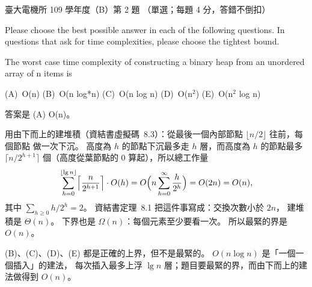 \begin{pastexam}[label={px:ntu-109-ee-ds-02}]{臺大電機所 109 學年度（B）第 2 題}
（單選；每題 4 分，答錯不倒扣）

Please choose the best possible answer in each of the following questions. In questions that ask
for time complexities, please choose the tightest bound.

The worst case time complexity of constructing a binary heap from an unordered array of n items is

(A)~O(n) \qquad (B)~O(n log*n) \qquad (C)~O(n log n) \qquad (D)~O(n$^2$) \qquad (E)~O(n$^2$ log n)
\end{pastexam}

\begin{pastsoln}
答案是 (A) O(n)。

用由下而上的建堆積（資結書虛擬碼~8.3）：從最後一個內部節點 $\lfloor n/2 \rfloor$ 往前，每個節點
做一次下沉。 高度為 $h$ 的節點下沉最多走 $h$ 層，而高度為 $h$ 的節點最多 $\lceil n/2^{h+1}
\rceil$ 個（高度從葉節點的 $0$ 算起），所以總工作量
\[
\sum_{h=0}^{\lfloor \lg n \rfloor} \Bigl\lceil \frac{n}{2^{h+1}} \Bigr\rceil \cdot O(h)
= O\Bigl(n \sum_{h=0}^{\infty} \frac{h}{2^{h}}\Bigr) = O(2n) = O(n),
\]
其中 $\sum_{h \ge 0} h/2^h = 2$。 資結書定理~8.1 把這件事寫成：交換次數小於 $2n$，
建堆積是 $\Theta(n)$。 下界也是 $\Omega(n)$：每個元素至少要看一次。
所以最緊的界是 $O(n)$。

(B)、(C)、(D)、(E) 都是正確的上界，但不是最緊的。 $O(n \log n)$ 是「一個一個插入」的建法，
每次插入最多上浮 $\lg n$ 層；題目要最緊的界，而由下而上的建法做得到 $O(n)$。
\end{pastsoln}
